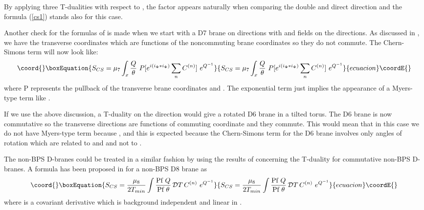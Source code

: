 \documentclass[a4paper,12pt]{article}
\begin{document}
By applying three T-dualities with respect to \coordHE{}, the factor 
\coordHE{} appears naturally when comparing the
double and direct direction and the formula (\ref{cs1}) stands also
for this case.

Another check for the formulas of \cite{ms} is made when 
we start with a D7 brane on \coordHE{} directions with
\coordHE{} and \coordHE{} fields on the \coordHE{} directions. As discussed in \cite{ms},
we have the transverse coordinates \coordHE{} which are functions of the
noncommuting brane coordinates so they do not commute. 
The Chern-Simons term will now look like:
\begin{equation}\coord{}\boxEquation{
\label{csd}
S_{CS} = \mu_7 \int_x {Q \over \theta}~P[e^{i(i_{\Phi} * i_{\Phi})}
\sum_n C^{(n)}]~e^{Q^{-1}} 
}{
S_{CS} = \mu_7 \int_x {Q \over \theta}~P[e^{i(i_{\Phi} * i_{\Phi})}
\sum_n C^{(n)}]~e^{Q^{-1}} 
}{ecuacion}\coordE{}\end{equation}
where P represents the pullback of the transverse brane coordinates and
\coordHE{}. 
The exponential term \coordHE{}
just implies the appearance of a Myers-type term like 
\coordHE{}. 

If we use the above discussion, a T-duality on the \coordHE{} direction would give
a rotated D6 brane in a tilted torus. The D6 brane is now commutative so the
transverse directions are functions of commuting coordinate and they 
commute. This would mean that in this case we do not have
Myers-type term because \coordHE{}, and this is expected
because the Chern-Simons term for the D6 brane involves only angles of
rotation which are related to \coordHE{} and \coordHE{} and not to 
\coordHE{}.

The non-BPS D-branes could be treated in a similar fashion by 
using the results of 
\cite{ga,b2} concerning the T-duality 
for commutative non-BPS D-branes. A formula has been 
proposed in \cite{ms} for a non-BPS D8 brane as
\begin{equation}\coord{}\boxEquation{
S_{CS} = \frac{\mu_{8}}{2T_{min}}\int  {\mbox{Pf}~Q\over \mbox{Pf}~\theta}\,
{\cal D}T\, C^{(n)}~e^{Q^{-1}}
}{
S_{CS} = \frac{\mu_{8}}{2T_{min}}\int  {\mbox{Pf}~Q\over \mbox{Pf}~\theta}\,
{\cal D}T\, C^{(n)}~e^{Q^{-1}}
}{ecuacion}\coordE{}\end{equation}
where \coordHE{} is a covariant derivative 
which is background independent and linear in \myHighlight{$[X^j,T]$}\coordHE{}.
\end{document}

